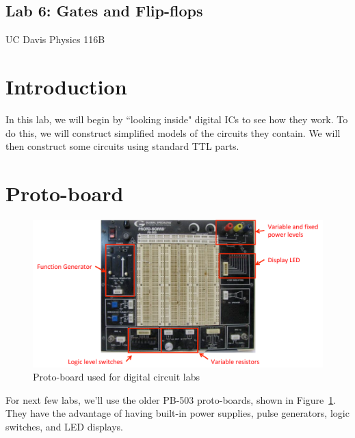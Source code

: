 \documentclass[12pt]{article}
\begin{document}




\begin{center}
\section*{Lab 6: Gates and Flip-flops}
UC Davis Physics 116B\\
\end{center}

\section*{Introduction}

In this lab, we will begin by ``looking inside" digital ICs to see how they work. To do this, we will construct simplified models of the circuits they contain.  We will then construct some circuits using standard TTL parts.

\section*{Proto-board}

\begin{figure}[!h]
\centerline{\includegraphics[width=7in]{figs/proto-board.pdf}}
\caption{Proto-board used for digital circuit labs}
\label{fig:proto-board}
\end{figure}

For next few labs, we'll use the older PB-503 proto-boards, shown in Figure~\ref{fig:proto-board}.  They have the advantage of having built-in power supplies, pulse generators, logic switches, and LED displays.  
\end{document}
